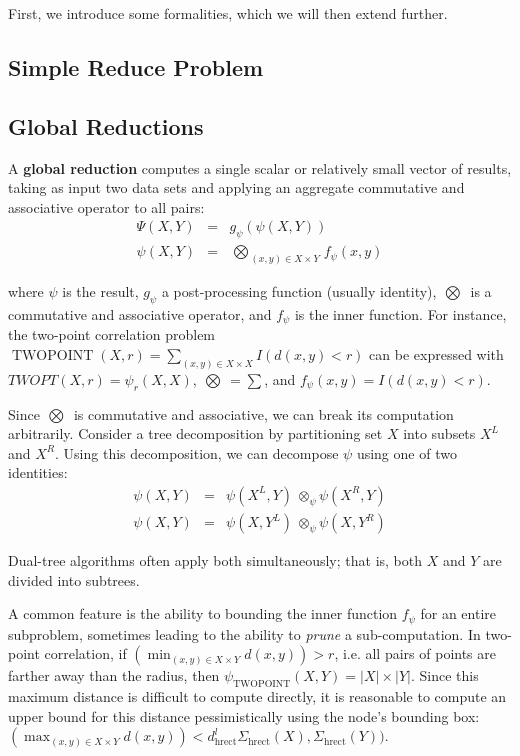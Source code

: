 \documentclass[times, leqno,twocolumn]{article}
\DeclareMathOperator{\TWOPT}{TWOPOINT}
\newcommand{\defterm}[1]{{\bf #1}}
\newcommand{\kdleft}[1]{#1^{\!L}}
\newcommand{\kdright}[1]{#1^{\!R}}
\newcommand{\lo}[1]{#1^{l}}
\newcommand{\distlo}[1]{\lo{d_{\text{hrect}}}}
\newcommand{\myOp}[1]{\mathop{\bigotimes\nolimits\!\!_{#1}}}
\newcommand{\myop}[1]{{\scriptstyle\:}\otimes_{\!#1}}
\newcommand{\letterglob}{\psi}
\newcommand{\outglob}{\Psi}
\newcommand{\inglob}{\psi}
\newcommand{\Opglob}{\myOp{\letterglob}}
\newcommand{\opglob}{\myop{\letterglob}}
\newcommand{\fglob}{f_{\letterglob}}
\newcommand{\gglob}{g_{\letterglob}}
\newcommand{\namestat}[1]{\Sigma_{\text{#1}}}
\begin{document}
First, we introduce some formalities, which we will then extend further.

\subsection{Simple Reduce Problem}

\subsection{Global Reductions}

A \defterm{global reduction} computes a single scalar or relatively small vector of results, taking as input two data sets and applying an aggregate commutative and associative operator to all pairs:
\begin{eqnarray*}
\outglob(X, Y) &=& \gglob(\inglob(X, Y))
\\
\inglob(X, Y) &=& \Opglob_{(x, y) \in X \times Y} \fglob(x, y)
\label{eqn:defglob}
\end{eqnarray*}

\noindent where $\inglob$ is the result, $\gglob$ a post-processing function (usually identity), $\Opglob$ is a commutative and associative operator, and $\fglob$ is the inner function.
For instance, the two-point correlation problem $\TWOPT(X, r) = \sum_{(x, y) \in X \times X} I(d(x, y) < r)$ can be expressed with $TWOPT(X, r) = \inglob_r(X, X)$, $\Opglob = \sum$, and $\fglob(x, y) = I(d(x, y) < r)$.

Since $\Opglob$ is commutative and associative, we can break its computation arbitrarily.
Consider a tree decomposition by partitioning set $X$ into subsets $\kdleft{X}$ and $\kdright{X}$.
Using this decomposition, we can decompose $\inglob$ using one of two identities:
\begin{eqnarray}
\inglob(X, Y) &=& \inglob(\kdleft{X}, Y) \opglob \inglob(\kdright{X}, Y)
\\
\inglob(X, Y) &=& \inglob(X, \kdleft{Y}) \opglob \inglob(X, \kdright{Y})
\label{eqn:divideglob}
\end{eqnarray}

\noindent Dual-tree algorithms often apply both simultaneously; that is, both $X$ and $Y$ are divided into subtrees.

A common feature is the ability to bounding the inner function $\fglob$ for an entire subproblem, sometimes leading to the ability to {\it prune} a sub-computation.
In two-point correlation, if $\left(\min_{(x, y) \in X \times Y} d(x, y)\right) > r$, i.e. all pairs of points are farther away than the radius, then $\inglob_{\TWOPT}(X, Y) = |X| \times |Y|$.
Since this maximum distance is difficult to compute directly, it is reasonable to compute an upper bound for this distance pessimistically using the node's bounding box: $\left(\max_{(x, y) \in X \times Y} d(x, y)\right) < \distlo(\namestat{hrect}(X), \namestat{hrect}(Y))$.
\end{document}
